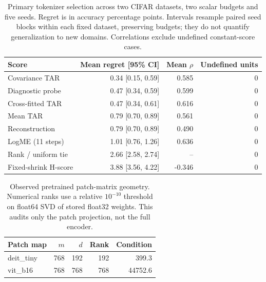 \begin{table}[t]
\centering\small
\caption{Primary tokenizer selection across two CIFAR datasets, two scalar budgets and five seeds. Regret is in accuracy percentage points. Intervals resample paired seed blocks within each fixed dataset, preserving budgets; they do not quantify generalization to new domains. Correlations exclude undefined constant-score cases.}\label{tab:selection}
\begin{tabular}{lrrr}\toprule Score & Mean regret [95\% CI] & Mean $\rho$ & Undefined units\\\midrule
Covariance TAR & 0.34 [0.15, 0.59] & 0.585 & 0\\
Diagnostic probe & 0.47 [0.34, 0.59] & 0.599 & 0\\
Cross-fitted TAR & 0.47 [0.34, 0.61] & 0.616 & 0\\
Mean TAR & 0.79 [0.70, 0.89] & 0.561 & 0\\
Reconstruction & 0.79 [0.70, 0.89] & 0.490 & 0\\
LogME (11 steps) & 1.01 [0.76, 1.26] & 0.636 & 0\\
Rank / uniform tie & 2.66 [2.58, 2.74] & -- & 0\\
Fixed-shrink H-score & 3.88 [3.56, 4.22] & -0.346 & 0\\
\bottomrule\end{tabular}\end{table}
\begin{table}[t]
\centering\small
\caption{Observed pretrained patch-matrix geometry. Numerical ranks use a relative $10^{-10}$ threshold on float64 SVD of stored float32 weights. This audits only the patch projection, not the full encoder.}\label{tab:pretrained}
\begin{tabular}{lrrrr}\toprule Patch map & $m$ & $d$ & Rank & Condition\\\midrule
deit\_tiny & 768 & 192 & 192 & 399.3\\
vit\_b16 & 768 & 768 & 768 & 44752.6\\
\bottomrule\end{tabular}\end{table}
